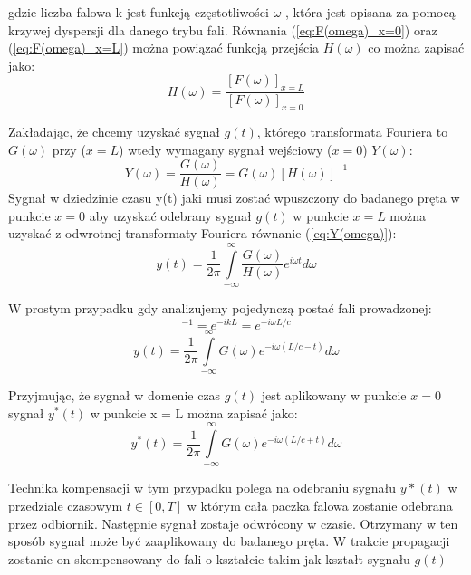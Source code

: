 gdzie liczba falowa k jest funkcją częstotliwości $\omega$  , która jest opisana za pomocą krzywej dyspersji dla danego trybu fali. Równania (\ref{eq:F(omega)_x=0}) oraz (\ref{eq:F(omega)_x=L}) można powiązać funkcją przejścia $H(\omega)$ co można zapisać jako:
\begin{equation}
H(\omega) = \frac{[F(\omega)]_{x=L}}{[F(\omega)]_{x=0}} \label{eq:h(omega)}
\end{equation}

Zakładając, że chcemy uzyskać sygnał $g(t)$, którego transformata Fouriera to $G(\omega)$ przy ($x = L$) wtedy wymagany sygnał wejściowy ($x = 0$) $Y(\omega)$:
\begin{equation}
Y(\omega) = \frac{G(\omega)}{H(\omega)} = G(\omega)[H(\omega)]^{-1} \label{eq:Y(omega)}
\end{equation}
Sygnał w dziedzinie czasu y(t) jaki musi zostać wpuszczony do badanego pręta w punkcie $x=0$ aby uzyskać odebrany sygnał $g(t)$ w punkcie $x=L$ można uzyskać z odwrotnej transformaty Fouriera równanie (\ref{eq:Y(omega)}):
\begin{equation}
y(t) = \frac{1}{2\pi}\int\limits_{-\infty}^{\infty}\frac{G(\omega)}{H(\omega)}e^{i\omega t}d\omega \label{eq:y(t)}
\end{equation}

W prostym przypadku gdy analizujemy pojedynczą postać fali prowadzonej:
\begin{equation}
[H(\omega)]^{-1} = e^{-ikL} = e^{-i\omega L/c}
\end{equation}
\begin{equation}
y(t) = \frac{1}{2\pi}\int\limits_{-\infty}^{\infty}G(\omega)e^{-i\omega (L/c - t)}d\omega
\end{equation}

Przyjmując, że sygnał w domenie czas $g(t)$ jest aplikowany w punkcie $x = 0$ sygnał $y^*(t)$ w punkcie x = L można zapisać jako:
\begin{equation}
y^*(t) = \frac{1}{2\pi}\int\limits_{-\infty}^{\infty}G(\omega)e^{-i\omega (L/c + t)}d\omega
\end{equation}

Technika kompensacji w tym przypadku polega na odebraniu sygnału $y*(t)$ w przedziale czasowym $t\in [0,T]$ w którym cała paczka falowa zostanie odebrana przez odbiornik. Następnie sygnał zostaje odwrócony w czasie. Otrzymany w ten sposób sygnał może być zaaplikowany do badanego pręta. W trakcie propagacji zostanie on skompensowany do fali o kształcie takim jak kształt sygnału $g(t)$

